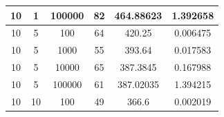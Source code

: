 \documentclass[11pt,a4paper]{report}
\begin{document}
\begin{table}[H]
{\begin{tabular}{c|c|c|c|c|c}
10                                                                                   & 1                                                                                      & 100000                                                                    & 82                                                                                        & 464.88623                                                                 & 1.392658              \\ \hline
10                                                                                   & 5                                                                                      & 100                                                                       & 64                                                                                        & 420.25                                                                    & 0.006475              \\
10                                                                                   & 5                                                                                      & 1000                                                                      & 55                                                                                        & 393.64                                                                    & 0.017583              \\
10                                                                                   & 5                                                                                      & 10000                                                                     & 65                                                                                        & 387.3845                                                                  & 0.167988              \\
10                                                                                   & 5                                                                                      & 100000                                                                    & 61                                                                                        & 387.02035                                                                 & 1.394215              \\ \hline
10                                                                                   & 10                                                                                     & 100                                                                       & 49                                                                                        & 366.6                                                                     & 0.002019              \\

\end{tabular}}
\end{table}
\end{document}
